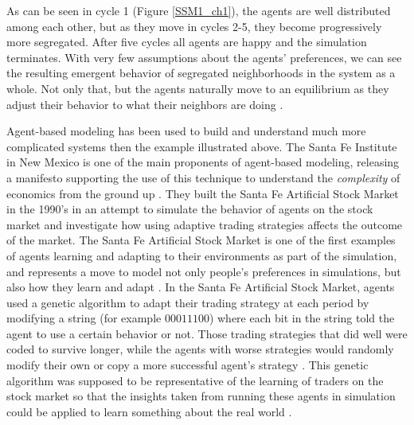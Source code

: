 \documentclass[12pt,twoside]{reedthesis}
\begin{document}
As can be seen in cycle 1 (Figure \ref{SSM1_ch1}), the agents are well distributed among each other, but as they move in cycles 2-5, they become progressively more segregated. After five cycles all agents are happy and the simulation terminates. With very few assumptions about the agents' preferences, we can see the resulting emergent behavior of segregated neighborhoods in the system as a whole. Not only that, but the agents naturally move to an equilibrium as they adjust their behavior to what their neighbors are doing \citep{Sargent2019}. 

Agent-based modeling has been used to build and understand much more complicated systems then the example illustrated above. The Santa Fe Institute in New Mexico is one of the main proponents of agent-based modeling, releasing a manifesto supporting the use of this technique to understand the {\em complexity} of economics from the ground up \citep{Backhouse2016}. They built the Santa Fe Artificial Stock Market in the 1990's in an attempt to simulate the behavior of agents on the stock market and investigate how using adaptive trading strategies affects the outcome of the market. The Santa Fe Artificial Stock Market is one of the first examples of agents learning and adapting to their environments as part of the simulation, and represents a move to model not only people's preferences in simulations, but also how they learn and adapt \citep{LeBaron2002}. In the Santa Fe Artificial Stock Market, agents used a genetic algorithm to adapt their trading strategy at each period by modifying a string (for example $00011100$) where each bit in the string told the agent to use a certain behavior or not. Those trading strategies that did well were coded to survive longer, while the agents with worse strategies would randomly modify their own or copy a more successful agent's strategy \citep{Joshi1998}. This genetic algorithm was supposed to be representative of the learning of traders on the stock market so that the insights taken from running these agents in simulation could be applied to learn something about the real world \citep{Arthur1992}. 
\end{document}
